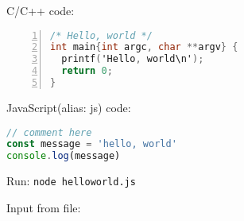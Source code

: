 \documentclass{article}
\begin{document}
C/C++ code:

\begin{lstlisting}[language=C,caption={C/C++ language},numbers=left]
/* Hello, world */
int main{int argc, char **argv} {
  printf('Hello, world\n');
  return 0;
}
\end{lstlisting}


JavaScript(alias: js) code:

\begin{lstlisting}[language=js,caption={JavaScript language}]
// comment here
const message = 'hello, world'
console.log(message)
\end{lstlisting}

Run: \lstinline!node helloworld.js!


Input from file:


\end{document}
